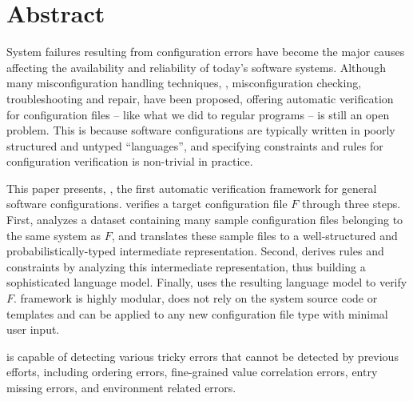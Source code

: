 
\section*{Abstract}

System failures resulting from configuration errors 
have become the major causes affecting the availability and
reliability of today's software systems.
Although many misconfiguration handling techniques,
\eg, misconfiguration checking, troubleshooting and repair, 
have been proposed, 
offering automatic verification for configuration files -- like
what we did to regular programs -- is still an open problem.
This is because software configurations are typically written in
poorly structured and untyped ``languages'', and 
specifying constraints and rules for configuration 
verification is non-trivial in practice.

This paper presents, \app, the first automatic verification framework for
general software configurations.
\app verifies a target configuration file $F$ through three steps.
First, \app analyzes a dataset containing many sample configuration 
files belonging to the same system as $F$,
and translates these sample files to a
well-structured and probabilistically-typed 
intermediate representation.
Second, \app derives rules and constraints by analyzing
this intermediate representation, thus building a
sophisticated language model.
Finally, \app uses the resulting language model to verify $F$.
\app framework is highly modular, 
does not rely on the system source code or templates and
can be applied to any new configuration file type with minimal user input. 

\app is capable of detecting various tricky errors that cannot
be detected by previous efforts,
including ordering errors, fine-grained value correlation errors, 
entry missing errors, and environment related errors. 
